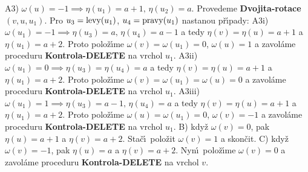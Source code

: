 \flushpar A3) $\omega (u)=-1\implies\eta (u_1)=a+1,\,\eta (u_2)=a$.  Provedeme 
{\bf Dvojita-rotace$(v,u,u_1)$}.  Pro $u_3=\operatorname{levy}(u_1)$, 
$u_4=\operatorname{pravy}(u_1)$ nastanou p\v r\'\i pady:\newline 
A3i) $\omega (u_1)=-1\implies\eta (u_3)=a,\,\eta (u_4)=a-1$ a tedy 
$\eta (v)=\eta (u)=a+1$ a $\eta (u_1)=a+2$. Proto polo\v z\'\i me 
$\omega (v)=\omega (u_1)=0$, $\omega (u)=1$ a zavol\'ame proceduru {\bf Kontrola-DELETE }
na vrchol $u_1$.\newline 
A3ii) $\omega (u_1)=0\implies\eta (u_3)=\eta (u_4)=a$ a tedy 
$\eta (v)=\eta (u)=a+1$ a $\eta (u_1)=a+2$. Proto polo\v z\'\i me 
$\omega (v)=\omega (u_1)=\omega (u)=0$ a zavol\'ame proceduru {\bf Kontrola-DELETE }
na vrchol $u_1$.\newline 
A3iii) $\omega (u_1)=1\implies\eta (u_3)=a-1,\,\eta (u_4)=a$ a tedy 
$\eta (v)=\eta (u)=a+1$ a $\eta (u_1)=a+2$. Proto polo\v z\'\i me 
$\omega (u)=\omega (u_1)=0$, $\omega (v)=-1$ a zavol\'ame proceduru {\bf Kontrola-DELETE }
na vrchol $u_1$.\newline 
B) kdy\v z $\omega (v)=0$, pak $\eta (u)=a+1$ a $\eta (v)=a+2$. 
Sta\v c\'\i\ polo\v zit $\omega (v)=1$ a skon\v cit.\newline 
C) kdy\v z $\omega (v)=-1$, pak $\eta (u)=a$ a $\eta (v)=a+2$. 
Nyn\'\i\ polo\v z\'\i me $\omega (v)=0$ a 
zavol\'ame proceduru {\bf Kontrola-DELETE} na vrchol $v$.
\medskip

